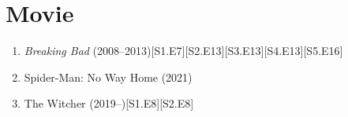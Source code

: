 \documentclass{article}
\numberwithin{equation}{section}
\begin{document}

\section{Movie}
\begin{enumerate}
	\item \textit{Breaking Bad} (2008--2013)\hfill[S1.E7][S2.E13][S3.E13][S4.E13][S5.E16]
	\item Spider-Man: No Way Home (2021)
	\item The Witcher (2019--)\hfill[S1.E8][S2.E8]
\end{enumerate}

\end{document}
